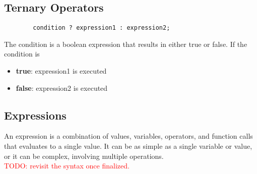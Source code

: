 \documentclass[11pt,A4]{article}
\newcommand{\todo}[1]{\textcolor{red}{#1}}
\begin{document}
        \subsection{Ternary Operators}
        \begin{lstlisting}
        condition ? expression1 : expression2;
        \end{lstlisting}
        The condition is a boolean expression that results in either true or false. If the condition is 
        \begin{itemize}
            \item \textbf{true}: expression1 is executed
            \item \textbf{false}: expression2 is executed
        \end{itemize}
        
        

        \subsection{Expressions}
        An expression is a combination of values, variables, operators, and function calls that evaluates to a single value. It can be as simple as a single variable or value, or it can be complex, involving multiple operations. \\
        \todo{TODO: revisit the syntax once finalized.}
\end{document}
